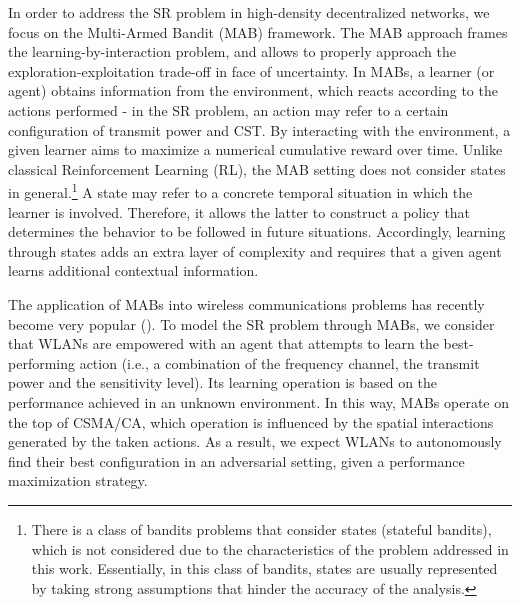 \documentclass{article}
\begin{document}
In order to address the SR problem in high-density decentralized networks, we focus on the Multi-Armed Bandit (MAB) framework. The MAB approach frames the learning-by-interaction problem, and allows to properly approach the exploration-exploitation trade-off in face of uncertainty. In MABs, a learner (or agent) obtains information from the environment, which reacts according to the actions performed - in the SR problem, an action may refer to a certain configuration of transmit power and CST. By interacting with the environment, a given learner aims to maximize a numerical cumulative reward over time. Unlike classical Reinforcement Learning (RL), the MAB setting does not consider states in general.\footnote{There is a class of bandits problems that consider states (stateful bandits), which is not considered due to the characteristics of the problem addressed in this work. Essentially, in this class of bandits, states are usually represented by taking strong assumptions that hinder the accuracy of the analysis.} A state may refer to a concrete temporal situation in which the learner is involved. Therefore, it allows the latter to construct a policy that determines the behavior to be followed in future situations. Accordingly, learning through states adds an extra layer of complexity and requires that a given agent learns additional contextual information.

The application of MABs into wireless communications problems has recently become very popular (\citealp{chen2010distributed, maghsudi2015channel, maghsudi2015joint}). To model the SR problem through MABs, we consider that WLANs are empowered with an agent that attempts to learn the best-performing action (i.e., a combination of the frequency channel, the transmit power and the sensitivity level). Its learning operation is based on the performance achieved in an unknown environment. In this way, MABs operate on the top of CSMA/CA, which operation is influenced by the spatial interactions generated by the taken actions. As a result, we expect WLANs to autonomously find their best configuration in an adversarial setting, given a performance maximization strategy.
\end{document}
